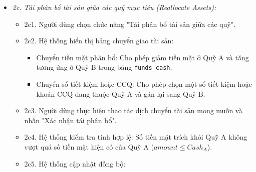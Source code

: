 \documentclass[11pt,a4paper]{article}
\providecommand{\tightlist}{
  \setlength{\itemsep}{0pt}\setlength{\parskip}{0pt}}
\begin{document}
\begin{itemize}
\begin{itemize}
    \begin{itemize}
    \tightlist
    \item
      2b1. Người dùng chọn một quỹ mục tiêu và nhấn nút "Điều chỉnh mục
      tiêu".
    \item
      2b2. Hệ thống hiển thị biểu mẫu cho phép sửa: Số tiền mục tiêu mới
      (\texttt{newTarget}), Hạn chót mới (\texttt{newDeadline}), Ghi chú
      định hướng.
    \item
      2b3. Người dùng nhập các thông số mới và nhấn "Lưu điều chỉnh".
    \item
      2b4. Hệ thống kiểm tra \(newTarget \ge 0\).
    \item
      2b5. Hệ thống cập nhật bảng \texttt{funds} với hạn mức mới, tính
      toán lại tỷ lệ tiến độ
      \(Process_{mới} = (Total_{fund} / newTarget) \times 100\%\).
    \item
      2b6. Thao tác này hoàn toàn không làm biến động số dư thực tế của
      ví tiền, sổ tiết kiệm hay CCQ.
    \item
      2b7. Hệ thống thông báo điều chỉnh thành công và cập nhật tỷ lệ
      tiến độ mới.
    \end{itemize}
  \item
    \emph{2c. Tái phân bổ tài sản giữa các quỹ mục tiêu (Reallocate
    Assets):}

    \begin{itemize}
    \tightlist
    \item
      2c1. Người dùng chọn chức năng "Tái phân bổ tài sản giữa các quỹ".
    \item
      2c2. Hệ thống hiển thị bảng chuyển giao tài sản:

      \begin{itemize}
      \tightlist
      \item
        Chuyển tiền mặt phân bổ: Cho phép giảm tiền mặt ở Quỹ A và tăng
        tương ứng ở Quỹ B trong bảng \texttt{funds\_cash}.
      \item
        Chuyển sổ tiết kiệm hoặc CCQ: Cho phép chọn một sổ tiết kiệm
        hoặc khoản CCQ đang thuộc Quỹ A và gán lại sang Quỹ B.
      \end{itemize}
    \item
      2c3. Người dùng thực hiện thao tác dịch chuyển tài sản mong muốn
      và nhấn "Xác nhận tái phân bổ".
    \item
      2c4. Hệ thống kiểm tra tính hợp lệ: Số tiền mặt trích khỏi Quỹ A
      không vượt quá số tiền mặt hiện có của Quỹ A
      (\(amount \le Cash_A\)).
    \item
      2c5. Hệ thống cập nhật đồng bộ:


\end{itemize}
\end{itemize}
\end{itemize}
\end{document}
